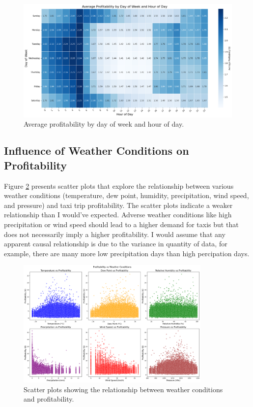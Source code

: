\documentclass[11pt]{article}
\begin{document}
\begin{figure}[h]
    \centering
    \includegraphics[width=\textwidth]{plots/prof_day_time.png} %
    \caption{Average profitability by day of week and hour of day.}
    \label{fig:profdaytime}
\end{figure}

\subsection{Influence of Weather Conditions on Profitability}
Figure \ref{fig:profweatherscatter} presents scatter plots that explore the relationship between various weather conditions (temperature, dew point, humidity, precipitation, wind speed, and pressure) and taxi trip profitability. The scatter plots indicate a weaker relationship than I would've expected. Adverse weather conditions like high precipitation or wind speed should lead to a higher demand for taxis but that does not necessarily imply a higher profitability. I would assume that any apparent causal relationship is due to the variance in quantity of data, for example, there are many more low precipitation days than high percipation days.

\begin{figure}[h]
    \centering
    \includegraphics[width=0.85\textwidth]{plots/prof_weather_scatter.png}
    \caption{Scatter plots showing the relationship between weather conditions and profitability.}
    \label{fig:profweatherscatter}
\end{figure}
\end{document}
